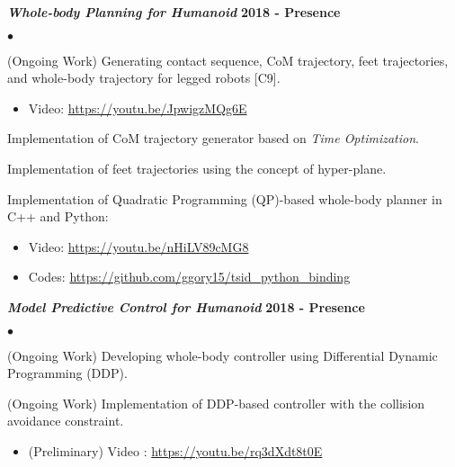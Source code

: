 \documentclass[margin,line]{res}
\newenvironment{list2}{
  \begin{list}{$\bullet$}{%
      \setlength{\itemsep}{0in}
      \setlength{\parsep}{0in} \setlength{\parskip}{0in}
      \setlength{\topsep}{0in} \setlength{\partopsep}{0in} 
      \setlength{\leftmargin}{0.2in}}}{\end{list}}
\begin{document}
\begin{resume}
  \vspace{-.3cm}
  \textbf{\emph {Whole-body Planning for Humanoid}} \hfill {\bf 2018 - Presence}
  \begin{list2}
    \item (Ongoing Work) Generating contact sequence, CoM trajectory, feet trajectories, and whole-body trajectory for legged robots [C9].
    \begin{itemize}
      \vspace*{-.05in}
      \item[\checkmark] Video: \url{https://youtu.be/JpwigzMQg6E}
            \vspace*{-.05in}
    \end{itemize}
    \item Implementation of CoM trajectory generator based on \textit{Time Optimization}.
    \item Implementation of feet trajectories using the concept of hyper-plane.
    \item Implementation of Quadratic Programming (QP)-based whole-body planner in C++ and Python:
    \begin{itemize}
      \vspace*{-.05in}
      \item[\checkmark] Video: \url{https://youtu.be/nHiLV89cMG8}
            \vspace*{-.05in}
      \item[\checkmark] Codes: \url{https://github.com/ggory15/tsid_python_binding}
            \vspace*{-.05in}
    \end{itemize}
  \end{list2}

  \textbf{\emph { Model Predictive Control for Humanoid}} \hfill {\bf 2018 - Presence}
  \begin{list2}
    \item (Ongoing Work) Developing whole-body controller using Differential Dynamic Programming (DDP).
    \item (Ongoing Work) Implementation of DDP-based controller with the collision avoidance constraint.
    \begin{itemize}
      \vspace*{-.05in}
      \item[\checkmark] (Preliminary) Video : \url{https://youtu.be/rq3dXdt8t0E}
            \vspace*{-.05in}
    \end{itemize}
  \end{list2}



\end{resume}
\end{document}
